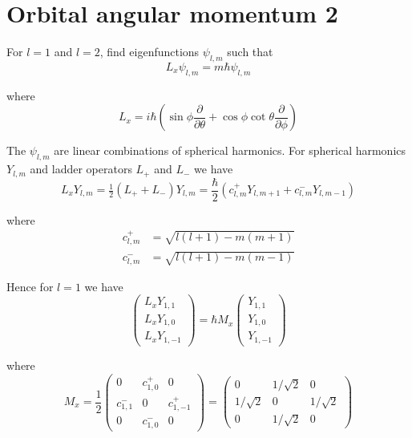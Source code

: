 


\section*{Orbital angular momentum 2}

For $l=1$ and $l=2$, find eigenfunctions $\psi_{l,m}$ such that
\begin{equation*}
L_x\psi_{l,m}=m\hbar\psi_{l,m}
\end{equation*}

where
\begin{equation*}
L_x=i\hbar\left(
\sin\phi\frac{\partial}{\partial\theta}+\cos\phi\cot\theta\frac{\partial}{\partial\phi}
\right)
\end{equation*}

The $\psi_{l,m}$ are linear combinations of spherical harmonics.
For spherical harmonics $Y_{l,m}$ and ladder operators $L_+$ and $L_-$ we have
\begin{equation*}
L_xY_{l,m}=\tfrac{1}{2}(L_++L_-)Y_{l,m}
=\frac{\hbar}{2}\left(c_{l,m}^+Y_{l,m+1}+c_{l,m}^-Y_{l,m-1}\right)
\end{equation*}

where
\begin{align*}
c_{l,m}^+&=\sqrt{l(l+1)-m(m+1)}
\\
c_{l,m}^-&=\sqrt{l(l+1)-m(m-1)}
\end{align*}

Hence for $l=1$ we have
\begin{equation*}
\begin{pmatrix}L_xY_{1,1}\\[1ex]L_xY_{1,0}\\[1ex]L_xY_{1,-1}\end{pmatrix}
=
\hbar M_x\begin{pmatrix}Y_{1,1}\\[1ex]Y_{1,0}\\[1ex]Y_{1,-1}\end{pmatrix}
\end{equation*}

where
\begin{equation*}
M_x=\frac{1}{2}\begin{pmatrix}
0 & c_{1,0}^+ & 0
\\[1ex]
c_{1,1}^- & 0 & c_{1,-1}^+
\\[1ex]
0 & c_{1,0}^- & 0
\end{pmatrix}
=
\begin{pmatrix}
0 & 1/\sqrt2 & 0
\\[1ex]
1/\sqrt2 & 0 & 1/\sqrt2
\\[1ex]
0 & 1/\sqrt2 & 0
\end{pmatrix}
\end{equation*}

